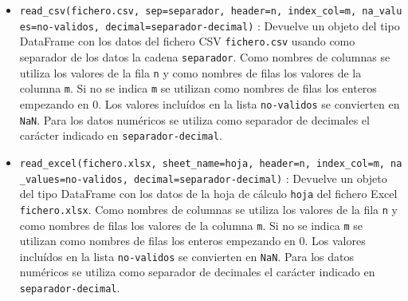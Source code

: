 \documentclass[
  spanish,
  a4paper,
]{scrreport}
\begin{document}
\begin{itemize}
\item
  \texttt{read\_csv(fichero.csv,\ sep=separador,\ header=n,\ index\_col=m,\ na\_values=no-validos,\ decimal=separador-decimal)}
  : Devuelve un objeto del tipo DataFrame con los datos del fichero CSV
  \texttt{fichero.csv} usando como separador de los datos la cadena
  \texttt{separador}. Como nombres de columnas se utiliza los valores de
  la fila \texttt{n} y como nombres de filas los valores de la columna
  \texttt{m}. Si no se indica \texttt{m} se utilizan como nombres de
  filas los enteros empezando en 0. Los valores incluídos en la lista
  \texttt{no-validos} se convierten en \texttt{NaN}. Para los datos
  numéricos se utiliza como separador de decimales el carácter indicado
  en \texttt{separador-decimal}.
\item
  \texttt{read\_excel(fichero.xlsx,\ sheet\_name=hoja,\ header=n,\ index\_col=m,\ na\_values=no-validos,\ decimal=separador-decimal)}
  : Devuelve un objeto del tipo DataFrame con los datos de la hoja de
  cálculo \texttt{hoja} del fichero Excel \texttt{fichero.xlsx}. Como
  nombres de columnas se utiliza los valores de la fila \texttt{n} y
  como nombres de filas los valores de la columna \texttt{m}. Si no se
  indica \texttt{m} se utilizan como nombres de filas los enteros
  empezando en 0. Los valores incluídos en la lista \texttt{no-validos}
  se convierten en \texttt{NaN}. Para los datos numéricos se utiliza
  como separador de decimales el carácter indicado en
  \texttt{separador-decimal}.
\end{itemize}
\end{document}
